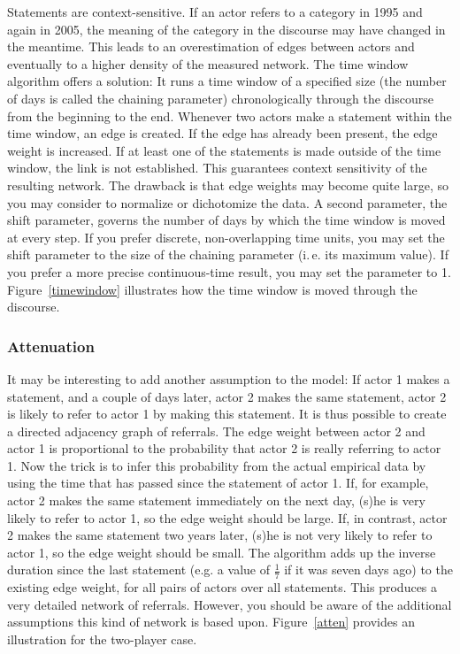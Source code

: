 \documentclass[12pt,a4paper]{scrreprt}
\begin{document}
Statements are context-sensitive. If an actor refers to a category in 1995 and again in 2005, the meaning of the category in the discourse may have changed in the meantime. This leads to an overestimation of edges between actors and eventually to a higher density of the measured network. The time window algorithm offers a solution: It runs a time window of a specified size (the number of days is called the chaining parameter) chronologically through the discourse from the beginning to the end. Whenever two actors make a statement within the time window, an edge is created. If the edge has already been present, the edge weight is increased. If at least one of the statements is made outside of the time window, the link is not established. This guarantees context sensitivity of the resulting network. The drawback is that edge weights may become quite large, so you may consider to normalize or dichotomize the data. A second parameter, the shift parameter, governs the number of days by which the time window is moved at every step. If you prefer discrete, non-overlapping time units, you may set the shift parameter to the size of the chaining parameter (i.\,e. its maximum value). If you prefer a more precise continuous-time result, you may set the parameter to 1. Figure~\ref{timewindow} illustrates how the time window is moved through the discourse.

\subsubsection{Attenuation}
It may be interesting to add another assumption to the model: If actor 1 makes a statement, and a couple of days later, actor 2 makes the same statement, actor 2 is likely to refer to actor 1 by making this statement. It is thus possible to create a directed adjacency graph of referrals. The edge weight between actor 2 and actor 1 is proportional to the probability that actor 2 is really referring to actor 1. Now the trick is to infer this probability from the actual empirical data by using the time that has passed since the statement of actor 1. If, for example, actor 2 makes the same statement immediately on the next day, (s)he is very likely to refer to actor 1, so the edge weight should be large. If, in contrast, actor 2 makes the same statement two years later, (s)he is not very likely to refer to actor 1, so the edge weight should be small. The algorithm adds up the inverse duration since the last statement (e.g. a value of $\frac{1}{7}$ if it was seven days ago) to the existing edge weight, for all pairs of actors over all statements. This produces a very detailed network of referrals. However, you should be aware of the additional assumptions this kind of network is based upon. Figure~\ref{atten} provides an illustration for the two-player case.
\end{document}
